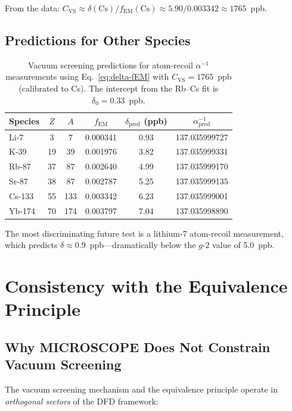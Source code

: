 \documentclass[aps,prd,twocolumn,superscriptaddress,nofootinbib]{revtex4-2}
\newcommand{\fEM}{f_{\mathrm{EM}}}
\newcommand{\ainv}{\alpha^{-1}}
\begin{document}
From the data: $C_{\mathrm{VS}} \approx
\delta(\mathrm{Cs})/\fEM(\mathrm{Cs}) \approx 5.90/0.003342 \approx 1765$~ppb.

\subsection{Predictions for Other Species}

\begin{table}[h]
\centering
\caption{Vacuum screening predictions for atom-recoil $\ainv$
measurements using Eq.~\eqref{eq:delta-fEM} with
$C_{\mathrm{VS}} = 1765$~ppb (calibrated to Cs).  The intercept
from the Rb--Cs fit is $\delta_0 = 0.33$~ppb.}
\label{tab:predictions}
\renewcommand{\arraystretch}{1.2}
\begin{tabular}{lccccc}
\toprule
Species & $Z$ & $A$ & $\fEM$ & $\delta_{\mathrm{pred}}$ (ppb)
  & $\ainv_{\mathrm{pred}}$ \\
\midrule
Li-7  & 3  & 7   & 0.000341 & 0.93  & 137.035999727 \\
K-39  & 19 & 39  & 0.001976 & 3.82  & 137.035999331 \\
Rb-87 & 37 & 87  & 0.002640 & 4.99  & 137.035999170 \\
Sr-87 & 38 & 87  & 0.002787 & 5.25  & 137.035999135 \\
Cs-133& 55 & 133 & 0.003342 & 6.23  & 137.035999001 \\
Yb-174& 70 & 174 & 0.003797 & 7.04  & 137.035998890 \\
\bottomrule
\end{tabular}
\end{table}

The most discriminating future test is a lithium-7 atom-recoil
measurement, which predicts $\delta \approx 0.9$~ppb---dramatically
below the $g$-$2$ value of 5.0~ppb.


\section{Consistency with the Equivalence Principle}
\label{sec:ep}

\subsection{Why MICROSCOPE Does Not Constrain Vacuum Screening}

The vacuum screening mechanism and the equivalence principle operate
in \emph{orthogonal sectors} of the DFD framework:
\end{document}
